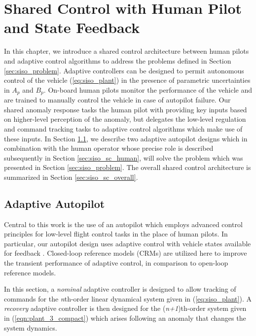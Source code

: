 \chapter{Shared Control with Human Pilot and State Feedback} \label{ch:siso_shared_ctrl}

In this chapter, we introduce a shared control architecture between human pilots and adaptive control algorithms to address the problems defined in Section \ref{sec:siso_problem}. Adaptive controllers can be designed to permit autonomous control of the vehicle (\ref{eq:siso_plant}) in the presence of parametric uncertainties in $A_p$ and $B_p$. On-board human pilots monitor the performance of the vehicle and are trained to manually control the vehicle in case of autopilot failure. Our shared anomaly response tasks the human pilot with providing key inputs based on higher-level perception of the anomaly, but delegates the low-level regulation and command tracking tasks to adaptive control algorithms which make use of these inputs. In Section \ref{sec:siso_sc_adaptive}, we describe two adaptive autopilot designs which in combination with the human operator whose precise role is described subsequently in Section \ref{sec:siso_sc_human}, will solve the problem which was presented in Section \ref{sec:siso_problem}. The overall shared control architecture is summarized in Section \ref{sec:siso_sc_overall}.

\section{Adaptive Autopilot} \label{sec:siso_sc_adaptive}
Central to this work is the use of an autopilot which employs advanced control principles for low-level flight control tasks in the place of human pilots. In particular, our autopilot design uses adaptive control with vehicle states available for feedback \cite{narendra2012stable}. Closed-loop reference models (CRMs) \cite{gibson2013adaptive} are utilized here to improve the transient performance of adaptive control, in comparison to open-loop reference models.

In this section, a \textit{nominal} adaptive controller is designed to allow tracking of commands for the \textit{n}th-order linear dynamical system given in (\ref{eq:siso_plant}). A \textit{recovery} adaptive controller is then designed for the (\textit{n+1})th-order system given in (\ref{eqn:plant_3_compact}) which arises following an anomaly that changes the system dynamics.

